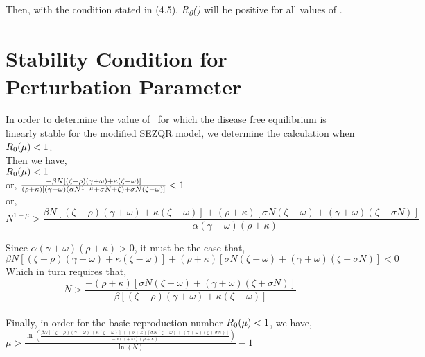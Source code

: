 Then, with the condition stated in (4.5), \textit{R\textsubscript{0}(\textmu)} will be positive for all values of \textmu.


\pagebreak
\section{Stability Condition for Perturbation Parameter}

In order to determine the value of \textmu \ for which the disease free equilibrium is linearly stable for the modified SEZQR model, we determine the calculation when $ R\textsubscript{0}(\mu) < 1 $. \\

Then we have, \\

$ R\textsubscript{0}(\mu) < 1 \\
$\\
or,
$
\frac{-\beta N[(\zeta-\rho)(\gamma+\omega)+\kappa(\zeta-\omega)]}{(\rho+\kappa)\left[(\gamma+\omega)\left(\alpha N^{1+\mu}+\sigma N+\zeta\right)+\sigma N(\zeta-\omega)\right]} < 1 \\
$
\\
or, 
\begin{equation}
N^{1+\mu}>\frac{\beta N[(\zeta-\rho)(\gamma+\omega)+\kappa(\zeta-\omega)]+(\rho+\kappa)[\sigma N(\zeta-\omega)+(\gamma+\omega)(\zeta+\sigma N)]}{-\alpha(\gamma+\omega)(\rho+\kappa)}
\end{equation}

Since $\alpha(\gamma+\omega)(\rho+\kappa) > 0$, it must be the case that, \\

$\beta N[(\zeta-\rho)(\gamma+\omega)+\kappa(\zeta-\omega)]+(\rho+\kappa)[\sigma N(\zeta-\omega)+(\gamma+\omega)(\zeta+\sigma N)] < 0 $ \\

Which in turn requires that, \\

\begin{equation}
N>\frac{-(\rho+\kappa)[\sigma N(\zeta-\omega)+(\gamma+\omega)(\zeta+\sigma N)]}{\beta[(\zeta-\rho)(\gamma+\omega)+\kappa(\zeta-\omega)]}
\end{equation} 
\\

Finally, in order for the basic reproduction number  $ R\textsubscript{0}(\mu) < 1 $, we have, \\


$ \mu>\frac{\ln \left(\frac{\beta N[(\zeta-\rho)(\gamma+\omega)+\kappa(\zeta-\omega)]+(\rho+\kappa)[\sigma N(\zeta-\omega)+(\gamma+\omega)(\zeta+\sigma N)]}{-\alpha(\gamma+\omega)(\rho+\kappa)}\right)}{\ln (N)}-1 $ \\

